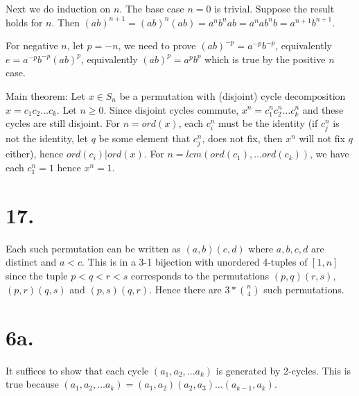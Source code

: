 \documentclass{article}
\begin{document}
Next we do induction on $n$. The base case $n=0$ is trivial. Suppose the result holds for $n$. Then $(ab)^{n+1} = (ab)^n(ab) = a^nb^na b = a^n a b^n b = a^{n+1}b^{n+1}$.

For negative $n$, let $p = -n$, we need to prove $(ab)^{-p} = a^{-p}b^{-p}$, equivalently $e = a^{-p}b^{-p} (ab)^p$, equivalently $(ab)^p = a^pb^p$ which is true by the positive $n$ case.

Main theorem: Let $x \in S_n$ be a permutation with (disjoint) cycle decomposition $x = c_1c_2\ldots c_k$. Let $n \ge 0$. Since disjoint cycles commute, $x^n = c_1^n c_2^n \ldots c_k^n$ and these cycles are still disjoint. For $n = ord(x)$, each $c_i^n$ must be the identity (if $c_j^n$ is not the identity, let $q$ be some element that $c_j^n$, does not fix, then $x^n$ will not fix $q$ either), hence $ord(c_i) | ord(x)$. For $n = lcm(ord(c_1), \ldots ord(c_k))$, we have each $c_1^n = 1$ hence $x^n = 1$.

\section*{17.}

Each such permutation can be written as $(a, b)(c, d)$ where $a, b, c, d$ are distinct and $a < c$. This is in a 3-1 bijection with unordered 4-tuples of $[1, n]$ since the tuple $p < q < r < s$ corresponds to the permutations $(p, q)(r, s)$, $(p, r)(q, s)$ and $(p, s)(q, r)$. Hence there are $3*\binom{n}{4}$ such permutations.

\section*{6a.}

It suffices to show that each cycle $(a_1, a_2, \ldots a_k)$ is generated by 2-cycles. This is true because $(a_1, a_2, \ldots a_k) = (a_1, a_2)(a_2, a_3)\ldots(a_{k-1}, a_k)$.
\end{document}
